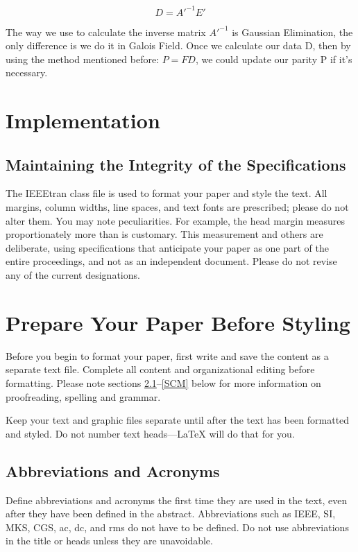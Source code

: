 \documentclass[conference]{IEEEtran}
\begin{document}
\begin{equation}
	D=A'^{-1}E'
\end{equation}

The way we use to calculate the inverse matrix $A'^{-1}$ is Gaussian Elimination, the only difference is we do it in Galois Field. Once we calculate our data D, then by using the method mentioned before: $P=FD$, we could update our parity P if it's necessary. 

\section{ Implementation}



\subsection{Maintaining the Integrity of the Specifications}

The IEEEtran class file is used to format your paper and style the text. All margins, 
column widths, line spaces, and text fonts are prescribed; please do not 
alter them. You may note peculiarities. For example, the head margin
measures proportionately more than is customary. This measurement 
and others are deliberate, using specifications that anticipate your paper 
as one part of the entire proceedings, and not as an independent document. 
Please do not revise any of the current designations.

\section{Prepare Your Paper Before Styling}
Before you begin to format your paper, first write and save the content as a 
separate text file. Complete all content and organizational editing before 
formatting. Please note sections \ref{AA}--\ref{SCM} below for more information on 
proofreading, spelling and grammar.

Keep your text and graphic files separate until after the text has been 
formatted and styled. Do not number text heads---{\LaTeX} will do that 
for you.

\subsection{Abbreviations and Acronyms}\label{AA}
Define abbreviations and acronyms the first time they are used in the text, 
even after they have been defined in the abstract. Abbreviations such as 
IEEE, SI, MKS, CGS, ac, dc, and rms do not have to be defined. Do not use 
abbreviations in the title or heads unless they are unavoidable.
\end{document}
